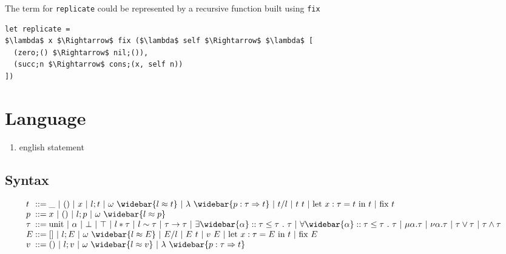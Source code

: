 \documentclass[manuscript]{acmart}
\begin{document}
\noindent The term for \lstinline{replicate} could be represented by a recursive function built using \lstinline{fix} 

\begin{lstlisting}[]
let replicate = 
$\lambda$ x $\Rightarrow$ fix ($\lambda$ self $\Rightarrow$ $\lambda$ [
  (zero;() $\Rightarrow$ nil;()),
  (succ;n $\Rightarrow$ cons;(x, self n))
]) 
\end{lstlisting}


\section{Language}
\begin{enumerate}
  \item english statement 
\end{enumerate}
\subsection{Syntax}

\[
  \begin{array}{l @{} l}
    t 
    &{} ::=
    \begin{array}[t]{@{} l}
      \_ 
      \ |\ 
      () 
      \ |\ 
      x
      \ |\ 
      l;t 
      \ |\ 
      \omega\ \widebar{l \approx t}
      \ |\ 
      \lambda\ \widebar{p : \tau \Rightarrow t} 
      \ |\ 
      t/l
      \ |\ 
      t\ t
      \ |\ 
      \text{let } x : \tau = t\ \text{in } t
      \ |\ 
      \text{fix } t
    \end{array}
    \\
    p 
    &{} ::=
    \begin{array}[t]{@{} l}
      x 
      \ |\ 
      () 
      \ |\ 
      l;p
      \ |\ 
      \omega\ \widebar{l \approx p}
    \end{array}
    \\
    \tau
    &{} ::=
    \begin{array}[t]{@{} l}
      \text{unit} 
      \ |\ 
      \alpha 
      \ |\ 
      \bot 
      \ |\ 
      \top 
      \ |\ 
      l*\tau 
      \ |\ 
      l\sim\tau 
      \ |\ 
      \tau\rightarrow\tau 
      \ |\ 
      \exists \widebar{\alpha} :: \tau \leq \tau \ .\ \tau 
      \ |\ 
      \forall \widebar{\alpha} :: \tau \leq \tau \ .\ \tau 
      \ |\ 
      \mu \alpha.\tau 
      \ |\ 
      \nu \alpha.\tau 
      \ |\ 
      \tau \vee \tau
      \ |\ 
      \tau \wedge \tau
    \end{array}
    \\
    E 
    &{} ::=
    []
    \ |\ 
    l;E 
    \ |\ 
    \omega\ \widebar{l \approx E}
    \ |\ 
    E/l
    \ |\ 
    E\ t
    \ |\ 
    v\ E
    \ |\ 
    \text{let } x : \tau = E\ \text{in } t
    \ |\ 
    \text{fix } E 
    \\
    v 
    &{} ::=
    \begin{array}[t]{@{} l}
      () 
      \ |\ 
      l;v
      \ |\ 
      \omega\ \widebar{l \approx v}
      \ |\ 
      \lambda\ \widebar{p : \tau \Rightarrow t} 
    \end{array}
  \end{array}
\]
\end{document}
